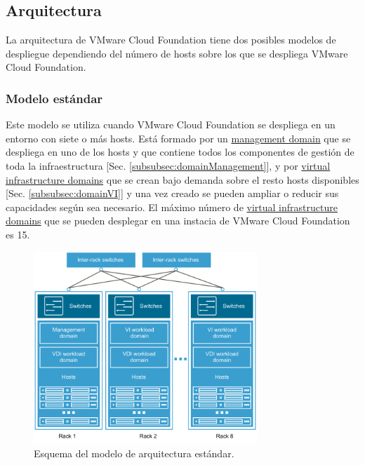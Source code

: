 \subsection{Arquitectura}
La arquitectura de VMware Cloud Foundation tiene dos posibles modelos de despliegue dependiendo del número de hosts sobre los que se despliega VMware Cloud Foundation.

\subsubsection{Modelo estándar}
Este modelo se utiliza cuando VMware Cloud Foundation se despliega en un entorno con siete o más hosts. Está formado por un \underline{management domain} que se despliega en uno de los hosts y que contiene todos los componentes de gestión de toda la infraestructura [Sec. \ref{subsubsec:domainManagement}], y por \underline{virtual infrastructure domains} que se crean bajo demanda sobre el resto hosts disponibles [Sec. \ref{subsubsec:domainVI}] y una vez creado se pueden ampliar o reducir sus capacidades según sea necesario. El máximo número de \underline{virtual infrastructure domains} que se pueden desplegar en una instacia de VMware Cloud Foundation es 15.

\begin{figure}[h!]
  \centering
  \includegraphics[width=0.75\textwidth]{imaxes/conceptosPrevios/arquitect_standarCF.png}
  \caption{Esquema del modelo de arquitectura estándar.}
  \label{fig:modelostandard}
\end{figure}

